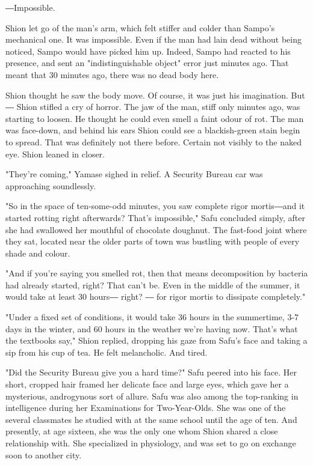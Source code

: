 ―Impossible.

Shion let go of the man's arm, which felt stiffer and colder than
Sampo's mechanical one. It was impossible. Even if the man had lain dead
without being noticed, Sampo would have picked him up. Indeed, Sampo had
reacted to his presence, and sent an "indistinguishable object" error
just minutes ago. That meant that 30 minutes ago, there was no dead body
here.

Shion thought he saw the body move. Of course, it was just his
imagination. But ― Shion stifled a cry of horror. The jaw of the man,
stiff only minutes ago, was starting to loosen. He thought he could even
smell a faint odour of rot. The man was face-down, and behind his ears
Shion could see a blackish-green stain begin to spread. That was
definitely not there before. Certain not visibly to the naked eye. Shion
leaned in closer.

"They're coming," Yamase sighed in relief. A Security Bureau car was
approaching soundlessly.

"So in the space of ten-some-odd minutes, you saw complete rigor
mortis―and it started rotting right afterwards? That's impossible," Safu
concluded simply, after she had swallowed her mouthful of chocolate
doughnut. The fast-food joint where they sat, located near the older
parts of town was bustling with people of every shade and colour.

"And if you're saying you smelled rot, then that means decomposition by
bacteria had already started, right? That can't be. Even in the middle
of the summer, it would take at least 30 hours― right? ― for rigor
mortis to dissipate completely."

"Under a fixed set of conditions, it would take 36 hours in the
summertime, 3-7 days in the winter, and 60 hours in the weather we're
having now. That's what the textbooks say," Shion replied, dropping his
gaze from Safu's face and taking a sip from his cup of tea. He felt
melancholic. And tired.

"Did the Security Bureau give you a hard time?" Safu peered into his
face. Her short, cropped hair framed her delicate face and large eyes,
which gave her a mysterious, androgynous sort of allure. Safu was also
among the top-ranking in intelligence during her Examinations for
Two-Year-Olds. She was one of the several classmates he studied with at
the same school until the age of ten. And presently, at age sixteen, she
was the only one whom Shion shared a close relationship with. She
specialized in physiology, and was set to go on exchange soon to another
city.

